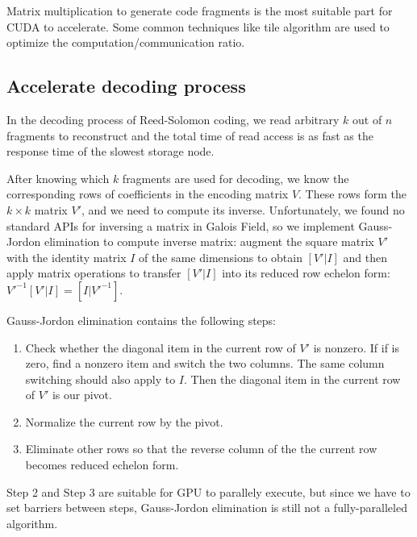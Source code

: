 \documentclass[a4paper]{article}
\begin{document}
Matrix multiplication to generate code fragments is the most suitable part for CUDA to accelerate.
Some common techniques like tile algorithm are used to optimize the computation/communication ratio.


\subsection{Accelerate decoding process}

In the decoding process of Reed-Solomon coding, 
we read arbitrary $k$ out of $n$ fragments to reconstruct and the total time of read access is as fast as the response time of the slowest storage node.



After knowing which $k$ fragments are used for decoding, we know the corresponding rows of coefficients in the encoding matrix $V$.
These rows form the $k \times k$ matrix $V'$, and we need to compute its inverse.
Unfortunately, we found no standard APIs for inversing a matrix in Galois Field, 
so we implement Gauss-Jordon elimination to compute inverse matrix: 
augment the square matrix $V'$ with the identity matrix $I$ of the same dimensions to obtain $[V' | I]$ and then apply matrix operations to transfer $[V' | I]$ into its reduced row echelon form: $V'^{-1}[V' | I] = [I | V'^{-1}]$.

Gauss-Jordon elimination contains the following steps:
\begin{enumerate}
\item Check whether the diagonal item in the current row of $V'$ is nonzero. If if is zero, find a nonzero item and switch the two columns. The same column switching should also apply to $I$. Then the diagonal item in the current row of $V'$ is our pivot.
\item Normalize the current row by the pivot.
\item Eliminate other rows so that the reverse column of the the current row becomes reduced echelon form.
\end{enumerate}
Step 2 and Step 3 are suitable for GPU to parallely execute, but since we have to set barriers between steps, Gauss-Jordon elimination is still not a fully-paralleled algorithm.
\end{document}
